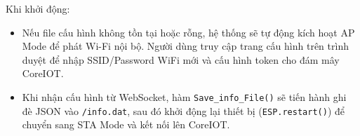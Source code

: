 Khi khởi động:
\begin{itemize}
    \item Nếu file cấu hình không tồn tại hoặc rỗng, hệ thống sẽ tự động kích hoạt AP Mode để phát Wi-Fi nội bộ. Người dùng truy cập trang cấu hình trên trình duyệt để nhập SSID/Password WiFi mới và cấu hình token cho đám mây CoreIOT.
    \item Khi nhận cấu hình từ WebSocket, hàm \texttt{Save\_info\_File()} sẽ tiến hành ghi đè JSON vào \texttt{/info.dat}, sau đó khởi động lại thiết bị (\texttt{ESP.restart()}) để chuyển sang STA Mode và kết nối lên CoreIOT.
\end{itemize}